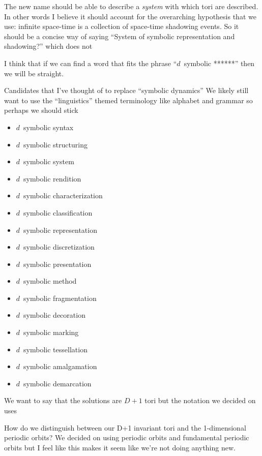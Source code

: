 \begin{description}
{The new name should be able to describe a \emph{system} with which tori
are described. In other words I believe it should account for the overarching
hypothesis that we use: infinite space-time is a collection of space-time shadowing
events. So it should be a concise way of saying ``System of symbolic representation
and shadowing?'' which does not

I think that if we can find a word that fits the phrase
``$d$\dmn\ symbolic ******'' then we will be straight.

Candidates that I've thought of to replace ``symbolic dynamics''
We likely still want to use the ``linguistics'' themed terminology
like alphabet and grammar so perhaps we should stick
\begin{itemize}
\item $d$\dmn\ symbolic syntax
\item $d$\dmn\ symbolic structuring
\item $d$\dmn\ symbolic system
\item $d$\dmn\ symbolic rendition
\item $d$\dmn\ symbolic characterization
\item $d$\dmn\ symbolic classification
\item $d$\dmn\ symbolic representation
\item $d$\dmn\ symbolic discretization
\item $d$\dmn\ symbolic presentation
\item $d$\dmn\ symbolic method
\item $d$\dmn\ symbolic fragmentation
\item $d$\dmn\ symbolic decoration
\item $d$\dmn\ symbolic marking
\item $d$\dmn\ symbolic tessellation
\item $d$\dmn\ symbolic amalgamation
\item $d$\dmn\ symbolic demarcation
\end{itemize}

We want to say that the solutions are $D+1$ tori but the notation
we decided on uses

How do we distinguish between our D+1 invariant tori and the
1-dimensional periodic orbits? We decided on using periodic orbits
and fundamental periodic orbits but I feel like this makes it seem
like we're not doing anything new.


}

\end{description}
